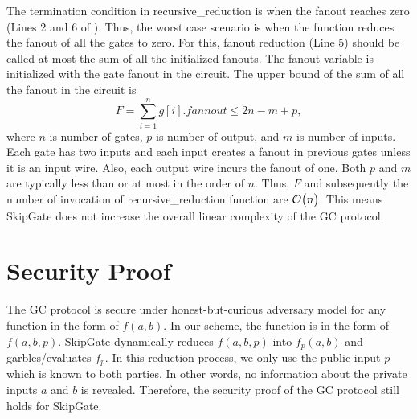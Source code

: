 The termination condition in recursive\_reduction is when the fanout reaches zero (Lines 2 and 6 of ).
Thus, the worst case scenario is when the function reduces the fanout of all the gates to zero.
For this, fanout reduction (Line 5) should be called at most the sum of all the initialized fanouts.
The fanout variable is initialized with the gate fanout in the circuit.
The upper bound of the sum of all the fanout in the circuit is $$F = \sum_{i=1}^{n} g[i].fannout \le 2n - m + p,$$ where $n$ is number of gates, $p$ is number of output,  and $m$ is number of inputs.
Each gate has two inputs and each input creates a fanout in previous gates unless it is an input wire.
Also, each output wire incurs the fanout of one.
Both $p$ and $m$ are typically less than or at most in the order of $n$.
Thus, $F$ and subsequently the number of invocation of recursive\_reduction function are $\mathcal{O}\bigl(n\bigr)$.
This means SkipGate does not increase the overall linear complexity of the GC protocol.

\section{Security Proof} The GC protocol is secure under honest-but-curious adversary model for any function in the form of $f(a,b)$.
In our scheme, the function is in the form of $f(a,b,p)$.
SkipGate dynamically reduces $f(a,b,p)$ into $f_p(a,b)$ and garbles/evaluates $f_p$.
In this reduction process, we only use the public input $p$ which is known to both parties.
In other words, no information about the private inputs $a$ and $b$ is revealed.
Therefore, the security proof of the GC protocol still holds for SkipGate.
